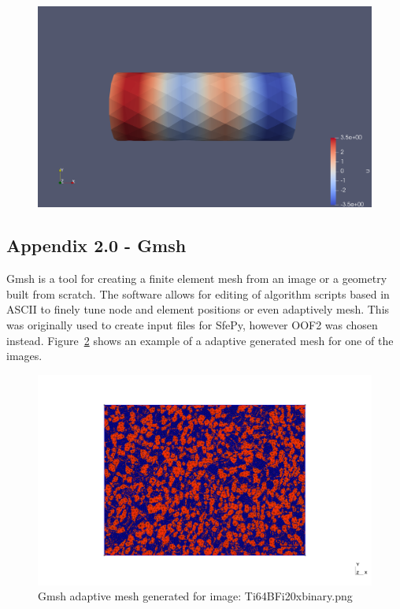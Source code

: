 \documentclass[\report.tex]{subfiles}
\begin{document}
\begin{figure}[h!]
    \centering
    \includegraphics[width=14cm]{Images/cylinder_diffusion.png}
    \caption{}
    \label{fig:sfepy_example}
\end{figure}


\subsection{Appendix 2.0 - Gmsh}
Gmsh is a tool for creating a finite element mesh from an image or a geometry built from scratch. The software allows for editing of algorithm scripts based in ASCII to finely tune node and element positions or even adaptively mesh. This was originally used to create input files for SfePy, however OOF2 was chosen instead. Figure~\ref{fig:gmsh} shows an example of a adaptive generated mesh for one of the images.

\begin{figure}[h!]
    \centering
    \includegraphics[width=14cm]{Images/out.png}
    \caption{Gmsh adaptive mesh generated for image: Ti64BFi20xbinary.png}
    \label{fig:gmsh}
\end{figure}
\end{document}
